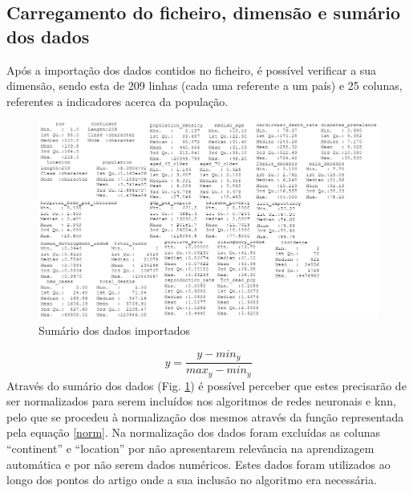 \documentclass[conference]{IEEEtran}
\begin{document}
\subsection{Carregamento do ficheiro, dimensão e sumário dos dados} 
\label{ex01}
Após a importação dos dados contidos no ficheiro, é possível verificar a sua dimensão, sendo esta de 209 linhas (cada uma referente a um país) e 25 colunas, referentes a indicadores acerca da população.
\begin{figure}[htbp]
\centerline{\includegraphics[width=0.95\columnwidth]{images/01.png}}
\caption{Sumário dos dados importados}
\label{summary}
\end{figure}
\begin{equation}
y = \frac{y-min_{y}}{max_{y}-min_{y}} \label{norm}
\end{equation}
Através do sumário dos dados (Fig. \ref{summary}) é possível perceber que estes precisarão de ser normalizados para serem incluídos nos algoritmos de redes neuronais e knn, pelo que se procedeu à normalização dos mesmos através da função representada pela equação \eqref{norm}.
Na normalização dos dados foram excluídas as colunas “continent” e “location” por não apresentarem relevância na aprendizagem automática e por não serem dados numéricos. Estes dados foram utilizados ao longo dos pontos do artigo onde a sua inclusão no algoritmo era necessária.
\end{document}
